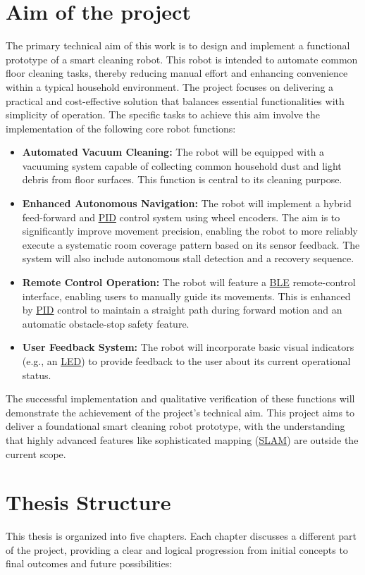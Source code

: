 \section{Aim of the project}
\label{sec:aim_intro}
The primary technical aim of this work is to design and implement a functional prototype of a smart cleaning robot. This robot is intended to automate common floor cleaning tasks, thereby reducing manual effort and enhancing convenience within a typical household environment. The project focuses on delivering a practical and cost-effective solution that balances essential functionalities with simplicity of operation. The specific tasks to achieve this aim involve the implementation of the following core robot functions:
\begin{itemize}
    \item \textbf{Automated Vacuum Cleaning:} The robot will be equipped with a vacuuming system capable of collecting common household dust and light debris from floor surfaces. This function is central to its cleaning purpose.
    \item \textbf{Enhanced Autonomous Navigation:} The robot will implement a hybrid feed-forward and \hyperref[term:pid]{PID} control system using wheel encoders. The aim is to significantly improve movement precision, enabling the robot to more reliably execute a systematic room coverage pattern based on its sensor feedback. The system will also include autonomous stall detection and a recovery sequence.
    \item \textbf{Remote Control Operation:} The robot will feature a \hyperref[term:ble]{BLE} remote-control interface, enabling users to manually guide its movements. This is enhanced by \hyperref[term:pid]{PID} control to maintain a straight path during forward motion and an automatic obstacle-stop safety feature.
    \item \textbf{User Feedback System:} The robot will incorporate basic visual indicators (e.g., an \hyperref[term:led]{LED}) to provide feedback to the user about its current operational status.
\end{itemize}
The successful implementation and qualitative verification of these functions will demonstrate the achievement of the project's technical aim. This project aims to deliver a foundational smart cleaning robot prototype, with the understanding that highly advanced features like sophisticated mapping (\hyperref[term:slam]{SLAM}) are outside the current scope.

\section{Thesis Structure}
\label{sec:structure_intro_section}
This thesis is organized into five chapters. Each chapter discusses a different part of the project, providing a clear and logical progression from initial concepts to final outcomes and future possibilities: %

